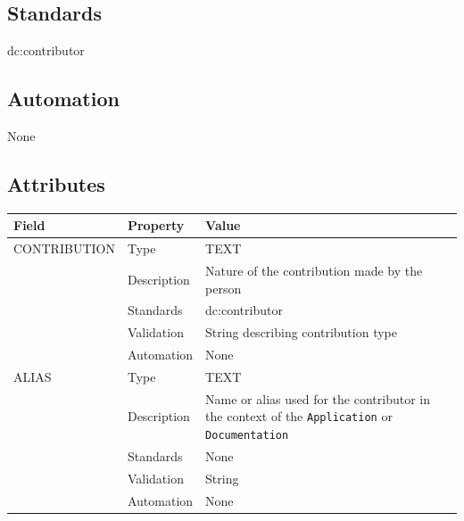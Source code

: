 \documentclass[
]{article}
\newcounter{none}
\begin{document}
\subsection{Standards}\label{standards-11}

dc:contributor

\subsection{Automation}\label{automation-11}

None

\subsection{Attributes}\label{attributes-11}

{\def\LTcaptype{none} 
\begin{longtable}[]{@{}
  >{\raggedright\arraybackslash}p{}
  >{\raggedright\arraybackslash}p{}
  >{\raggedright\arraybackslash}p{}@{}}
\toprule\noalign{}
\begin{minipage}[b]{\linewidth}\raggedright
Field
\end{minipage} & \begin{minipage}[b]{\linewidth}\raggedright
Property
\end{minipage} & \begin{minipage}[b]{\linewidth}\raggedright
Value
\end{minipage} \\
\midrule\noalign{}
\endhead
\bottomrule\noalign{}
\endlastfoot
CONTRIBUTION & Type & TEXT \\
& Description & Nature of the contribution made by the person \\
& Standards & dc:contributor \\
& Validation & String describing contribution type \\
& Automation & None \\
ALIAS & Type & TEXT \\
& Description & Name or alias used for the contributor in the context of
the \texttt{Application} or \texttt{Documentation} \\
& Standards & None \\
& Validation & String \\
& Automation & None \\
\end{longtable}
}
\end{document}
